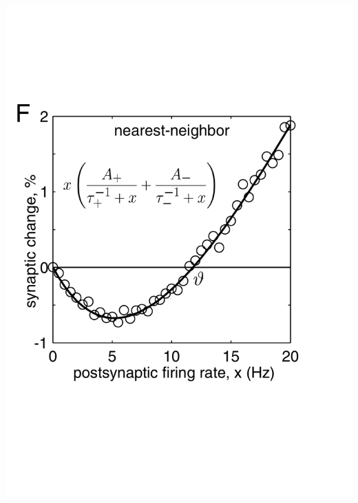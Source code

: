 \documentclass{beamer}
\begin{document}
\begin{frame}
\begin{columns}[T]
    \vspace*{-3.5mm}
    \includegraphics[width=\textwidth]{./figures/izhik_nn}


\end{columns}
\end{frame}
\end{document}
